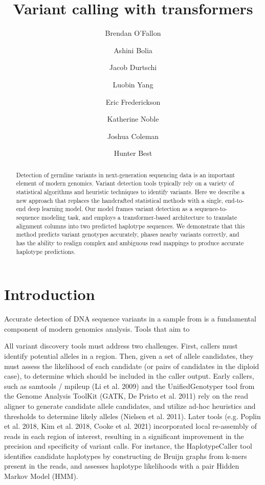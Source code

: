 \documentclass[]{article}
\title{Variant calling with transformers}
\author[1]{Brendan O'Fallon}
\author[1]{Ashini Bolia}
\author[1]{Jacob Durtschi}
\author[1]{Luobin Yang}
\author[1]{Eric Frederickson}
\author[1]{Katherine Noble}
\author[1]{Joshua Coleman}
\author[1]{Hunter Best}
\affil[1]{ARUP Institute for Clinical and Experimental Pathology, Salt Lake City, UT}
\date{}
\begin{document}
\maketitle

\begin{abstract}
	Detection of germline variants in next-generation sequencing data is an important element of modern genomics. Variant detection tools typically rely on a variety of statistical algorithms and heuristic techniques to identify variants. Here we describe a new approach that replaces the handcrafted statistical methods with a single, end-to-end deep learning model. Our model frames variant detection as a sequence-to-sequence modeling task, and employs a transformer-based architecture to translate alignment columns into two predicted haplotype sequences. We demonstrate that this method predicts variant genotypes accurately, phases nearby variants correctly, and has the ability to realign complex and ambiguous read mappings to produce accurate haplotype predictions. 

\end{abstract}



\section{Introduction}

Accurate detection of DNA sequence variants in a sample from is a fundamental component of modern genomics analysis. Tools that aim to 

All variant discovery tools must address two challenges. First, callers must identify potential alleles in a region. Then, given a set of allele candidates, they must assess the likelihood of each candidate (or pairs of candidates in the diploid case), to determine which should be included in the caller output. Early callers, such as samtools / mpileup (Li et al. 2009) and the UnifiedGenotyper tool from the Genome Analysis ToolKit (GATK, De Pristo et al. 2011) rely on the read aligner to generate candidate allele candidates, and utilize ad-hoc heuristics and thresholds to determine likely alleles (Nielsen et al. 2011). Later tools (e.g. Poplin et al. 2018, Kim et al. 2018, Cooke et al. 2021) incorporated local re-assembly of reads in each region of interest, resulting in a significant improvement in the precision and specificity of variant calls. For instance, the HaplotypeCaller tool identifies candidate haplotypes by constructing de Bruijn graphs from k-mers present in the reads, and assesses haplotype likelihoods with a pair Hidden Markov Model (HMM). 
\end{document}
